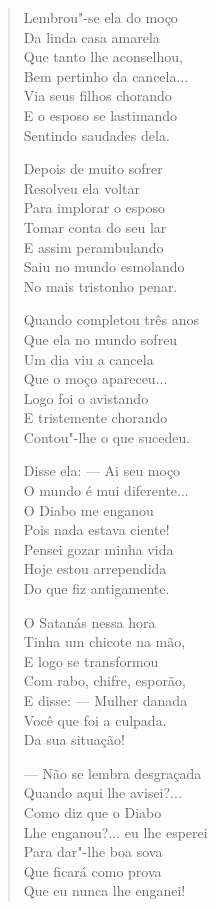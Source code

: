 \begin{verse}
Lembrou"-se ela do moço \\
Da linda casa amarela \\
Que tanto lhe aconselhou, \\
Bem pertinho da cancela... \\
Via seus filhos chorando \\
E o esposo se lastimando \\
Sentindo saudades dela. 

Depois de muito sofrer \\
Resolveu ela voltar \\
Para implorar o esposo \\
Tomar conta do seu lar \\
E assim perambulando \\
Saiu no mundo esmolando\\
No mais tristonho penar. 

Quando completou três anos \\
Que ela no mundo sofreu \\
Um dia viu a cancela \\
Que o moço apareceu... \\
Logo foi o avistando \\
E tristemente chorando \\
Contou"-lhe o que sucedeu. 
\pagebreak

Disse ela: ---  Ai seu moço \\
O mundo é mui diferente... \\
O Diabo me enganou \\
Pois nada estava ciente! \\
Pensei gozar minha vida \\
Hoje estou arrependida \\
Do que fiz antigamente. 

O Satanás nessa hora \\
Tinha um chicote na mão, \\
E logo se transformou \\
Com rabo, chifre, esporão, \\
E disse: ---  Mulher danada \\
Você que foi a culpada. \\
Da sua situação! 

---  Não se lembra desgraçada \\
Quando aqui lhe avisei?... \\
Como diz que o Diabo \\
Lhe enganou?... eu lhe esperei \\
Para dar"-lhe boa sova \\
Que ficará como prova \\
Que eu nunca lhe enganei! 


\end{verse}
